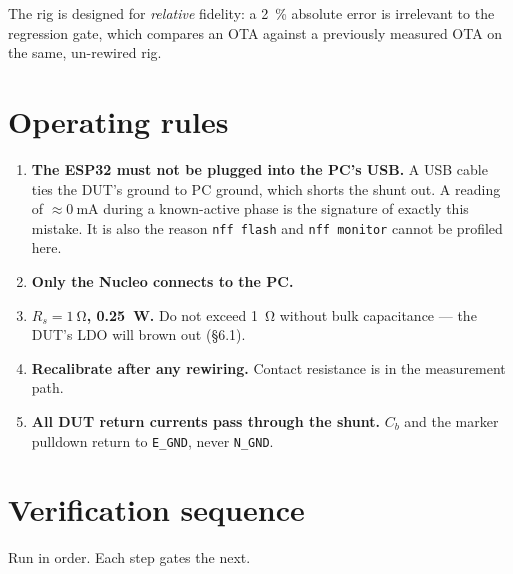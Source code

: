 \documentclass[11pt,a4paper]{article}
\begin{document}
\noindent
The rig is designed for \emph{relative} fidelity: a \SI{2}{\percent} absolute error is
irrelevant to the regression gate, which compares an OTA against a previously measured OTA
on the same, un-rewired rig.

\section{Operating rules}
\label{sec:rules}

\begin{enumerate}[leftmargin=*,label=\textbf{R\arabic*.}]
  \item \textbf{The ESP32 must not be plugged into the PC's USB.} A USB cable ties the DUT's
        ground to PC ground, which shorts the shunt out. A reading of $\approx\SI{0}{\milli\ampere}$
        during a known-active phase is the signature of exactly this mistake. It is also the
        reason \texttt{nff flash} and \texttt{nff monitor} cannot be profiled here.
  \item \textbf{Only the Nucleo connects to the PC.}
  \item \textbf{$R_s = \SI{1}{\ohm}$, \SI{0.25}{\watt}.} Do not exceed \SI{1}{\ohm} without
        bulk capacitance --- the DUT's LDO will brown out (\S6.1).
  \item \textbf{Recalibrate after any rewiring.} Contact resistance is in the measurement path.
  \item \textbf{All DUT return currents pass through the shunt.} $C_b$ and the marker pulldown
        return to \texttt{E\_GND}, never \texttt{N\_GND}.
\end{enumerate}

\section{Verification sequence}

Run in order. Each step gates the next.
\end{document}
